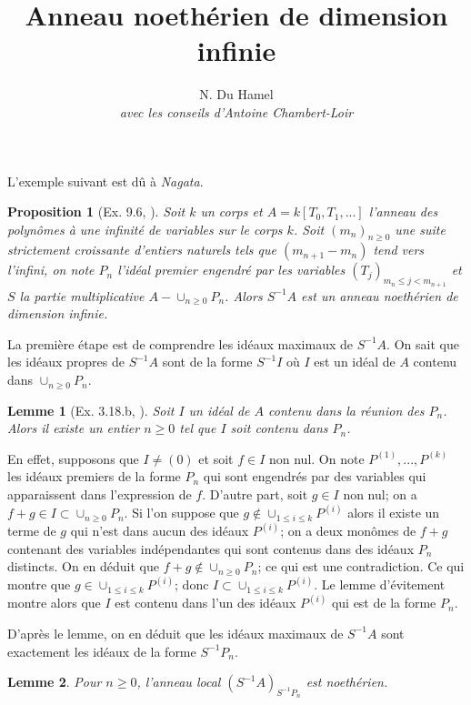 \documentclass{article}
\newtheorem{proposition}{Proposition}
\newtheorem{lemme}{Lemme}
\begin{document}
\title{Anneau noethérien de dimension infinie}
\author{N. Du Hamel \\ \emph{avec les conseils d'Antoine Chambert-Loir}}
\maketitle

L'exemple suivant est dû à \emph{Nagata}.
\begin{proposition}[Ex. 9.6, \cite{eisenbud}]
Soit $k$ un corps et $A = k[T_0, T_1, ...]$ l'anneau des polynômes à une infinité de variables sur le corps $k$. Soit $(m_n)_{n \geq 0}$ une suite strictement croissante d'entiers naturels tels que $( m_{n+1} - m_n )$ tend vers l'infini, on note $P_n$ l'idéal premier engendré par les variables $(T_j)_{m_n \leq j < m_{n+1}}$ et $S$ la partie multiplicative $A-\cup_{n \geq 0}P_n$. Alors $S^{-1}A$ est un anneau noethérien de dimension infinie.
\end{proposition}

La première étape est de comprendre les idéaux maximaux de $S^{-1}A$.
On sait que les idéaux propres de $S^{-1}A$ sont de la forme $S^{-1}I$ où $I$ est un idéal de $A$ contenu dans $\cup_{n \geq 0}P_n$.

\begin{lemme}[Ex. 3.18.b, \cite{eisenbud}]
Soit $I$ un idéal de $A$ contenu dans la réunion des $P_n$. Alors il existe un entier $n \geq 0$ tel que $I$ soit contenu dans $P_n$.
\end{lemme}

En effet, supposons que $I \neq (0)$ et soit $f \in I$ non nul. On note $P^{(1)}, ..., P^{(k)}$ les idéaux premiers de la forme $P_n$ qui sont engendrés par des variables qui apparaissent dans l'expression de $f$. D'autre part, soit $g \in I$ non nul; on a $f+g \in I \subset \cup_{n \geq 0}P_n$. Si l'on suppose que $g \not\in \cup_{1 \leq i \leq k}P^{(i)}$ alors il existe un terme de $g$ qui n'est dans aucun des idéaux $P^{(i)}$; on a deux monômes de $f+g$ contenant des variables indépendantes qui sont contenus dans des idéaux $P_n$ distincts. On en déduit que $f+g \not\in \cup_{n \geq 0}P_n$; ce qui est une contradiction. Ce qui montre que $g \in \cup_{1 \leq i \leq k}P^{(i)}$; donc $I \subset \cup_{1 \leq i \leq k}P^{(i)}$. Le lemme d'évitement montre alors que $I$ est contenu dans l'un des idéaux $P^{(i)}$ qui est de la forme $P_n$.

D'après le lemme, on en déduit que les idéaux maximaux de $S^{-1}A$ sont exactement les idéaux de la forme $S^{-1}P_n$.
\begin{lemme}
Pour $n \geq 0$, l'anneau local $(S^{-1}A)_{S^{-1}P_n}$ est noethérien.
\end{lemme}
\end{document}
